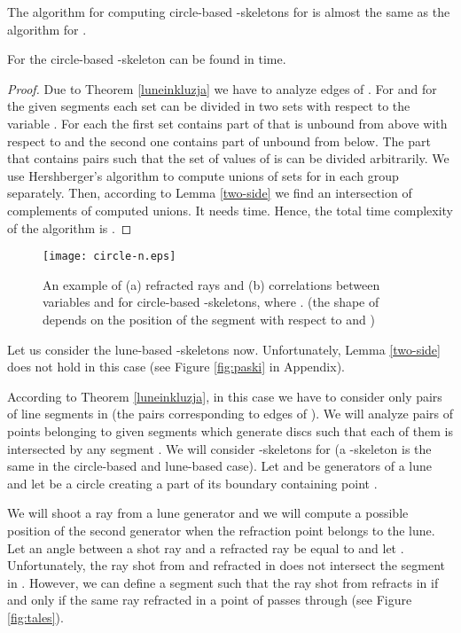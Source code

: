\documentclass[11pt]{llncs}
\begin{document}
The algorithm for computing circle-based -skeletons for  is almost
the same as the algorithm for . 


\begin{theorem}
For  the circle-based -skeleton  can be found 
in  time. 
\end{theorem} 
\begin{proof}
 Due to Theorem \ref{luneinkluzja} we have to analyze  edges of .
For  and for the given segments  each set 
can be divided in two sets with respect to the variable . For each  the first 
set contains part of  that is unbound from above with respect to  
and the second one contains part of  unbound from below.
The part that contains pairs  such that the set of values of  is  can be divided arbitrarily.
We use Hershberger's algorithm \cite{h89} to compute unions of sets for 
 in each group separately. 
Then, according to Lemma \ref{two-side} we find an intersection of complements of computed
unions.  
It needs  time. Hence, the total time complexity of the algorithm 
is .  
\end{proof}

\begin{figure}[htbp]
\centering
\texttt{[image: circle-n.eps]}
\caption{An example of (a) refracted rays and (b) correlations between variables  
and  for circle-based -skeletons, where .
(the shape of  depends on the position of the segment  with respect 
to  and )}
\label{fig:circle}
\end{figure}   


Let us consider the lune-based -skeletons now. Unfortunately, Lemma \ref{two-side}
does not hold in this case (see Figure \ref{fig:paski} in Appendix).



According to Theorem \ref{luneinkluzja}, in this case we have to consider only 
pairs of line segments in  (the pairs corresponding to edges of ).
 We will analyze pairs of points belonging to given segments 
which generate discs such that each of them is intersected by any segment 
.
We will consider -skeletons for  (a -skeleton is the same 
in the circle-based and lune-based case). 
Let  and  be generators of a lune 
 and let  be a circle creating 
a part of its boundary containing point . 

We will shoot a ray from a lune generator and we will compute a possible position
of the second generator when the refraction point belongs to the lune.
Let an angle between a shot ray and a refracted ray be equal to 
and let .
Unfortunately, the ray shot from  and refracted in 
does not intersect the segment  in .
However, we can define a segment  such that the ray shot from  refracts
in  if and only if the same ray refracted in a point of  passes through 
(see Figure \ref{fig:tales}).   
\end{document}
